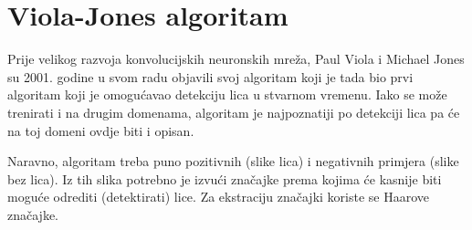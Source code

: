 \section{Viola-Jones algoritam}

Prije velikog razvoja konvolucijskih neuronskih mreža, Paul Viola i Michael Jones su 2001. godine u svom radu \citep{ViolaJones} objavili svoj algoritam koji je tada bio prvi algoritam koji je omogućavao detekciju lica u stvarnom vremenu. Iako se može trenirati i na drugim domenama, algoritam je najpoznatiji po detekciji lica pa će na toj domeni ovdje biti i opisan.

Naravno, algoritam treba puno pozitivnih (slike lica) i negativnih primjera (slike bez lica). Iz tih slika potrebno je izvući značajke prema kojima će kasnije biti moguće odrediti (detektirati) lice. Za ekstraciju značajki koriste se Haarove značajke.

